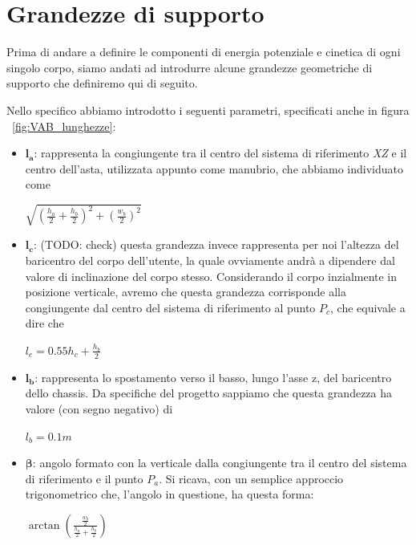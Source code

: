 \section{Grandezze di supporto}
Prima di andare a definire le componenti di energia potenziale e cinetica di ogni singolo corpo, siamo andati ad introdurre alcune grandezze geometriche di supporto che definiremo qui di seguito.

Nello specifico abbiamo introdotto i seguenti parametri, specificati anche in figura ~\ref{fig:VAB_lunghezze}:
\begin{itemize}
	\item $\mathbf{l_a}$: rappresenta la congiungente tra il centro del sistema di riferimento \textit{XZ} e il centro dell'asta, utilizzata appunto come manubrio, che abbiamo individuato come
	\begin{center}
		{\Large $\sqrt{(\frac{h_a}{2} + \frac{h_b}{2})^2 + (\frac{w_b}{2})^2}$}
	\end{center}
	\item $\mathbf{l_c}$: (TODO: check) questa grandezza invece rappresenta per noi l'altezza del baricentro del corpo dell'utente, la quale ovviamente andrà a dipendere dal valore di inclinazione del corpo stesso.
	Considerando il corpo inzialmente in posizione verticale, avremo che questa grandezza corrisponde alla congiungente dal centro del sistema di riferimento al punto $P_c$, che equivale a dire che
	\begin{center}
		$l_c = 0.55 h_c + \frac{h_b}{2}$
	\end{center}
	\item $\mathbf{l_b}$: rappresenta lo spostamento verso il basso, lungo l'asse z, del baricentro dello chassis. Da specifiche del progetto sappiamo che questa grandezza ha valore (con segno negativo) di
	\begin{center}
		$l_b = 0.1 m$
	\end{center}
	\item $\mathbf{\beta}$: angolo formato con la verticale dalla congiungente tra il centro del sistema di riferimento e il punto $P_a$. Si ricava, con un semplice approccio trigonometrico che, l'angolo in questione, ha questa forma:
	\begin{center}
		$\arctan{(\frac{\frac{w_b}{2}}{\frac{h_a}{2} + \frac{h_b}{2}})}$
	\end{center}
\end{itemize}

